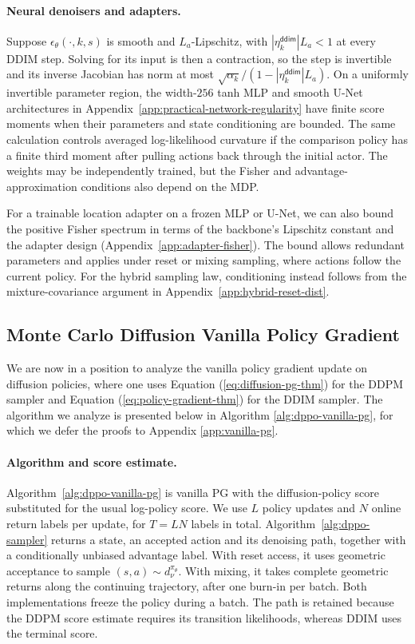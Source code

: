 \paragraph{Neural denoisers and adapters.}
Suppose $\epsilon_\theta(\cdot,k,s)$ is smooth and $L_a$-Lipschitz, with $|\eta_k^{\mathsf{ddim}}|L_a<1$ at every DDIM step. Solving for its input is then a contraction, so the step is invertible and its inverse Jacobian has norm at most $\sqrt{\alpha_k}/(1-|\eta_k^{\mathsf{ddim}}|L_a)$. On a uniformly invertible parameter region, the width-$256$ tanh MLP and smooth U-Net architectures in Appendix~\ref{app:practical-network-regularity} have finite score moments when their parameters and state conditioning are bounded. The same calculation controls averaged log-likelihood curvature if the comparison policy has a finite third moment after pulling actions back through the initial actor. The weights may be independently trained, but the Fisher and advantage-approximation conditions also depend on the MDP.

For a trainable location adapter on a frozen MLP or U-Net, we can also bound the positive Fisher spectrum in terms of the backbone's Lipschitz constant and the adapter design (Appendix~\ref{app:adapter-fisher}). The bound allows redundant parameters and applies under reset or mixing sampling, where actions follow the current policy. For the hybrid sampling law, conditioning instead follows from the mixture-covariance argument in Appendix~\ref{app:hybrid-reset-dist}.



\subsection{Monte Carlo Diffusion Vanilla Policy Gradient}
We are now in a position to analyze the vanilla policy gradient update on diffusion policies, where one uses Equation (\ref{eq:diffusion-pg-thm}) for the DDPM sampler and Equation (\ref{eq:policy-gradient-thm}) for the DDIM sampler. The algorithm we analyze is presented below in Algorithm \ref{alg:dppo-vanilla-pg}, for which we defer the proofs to Appendix \ref{app:vanilla-pg}.


\paragraph{Algorithm and score estimate.}
Algorithm~\ref{alg:dppo-vanilla-pg} is vanilla PG with the diffusion-policy score substituted for the usual log-policy score. We use $L$ policy updates and $N$ online return labels per update, for $T=LN$ labels in total. Algorithm~\ref{alg:dppo-sampler} returns a state, an accepted action and its denoising path, together with a conditionally unbiased advantage label. With reset access, it uses geometric acceptance to sample $(s,a)\sim d_\nu^{\pi_\theta}$. With mixing, it takes complete geometric returns along the continuing trajectory, after one burn-in per batch. Both implementations freeze the policy during a batch. The path is retained because the DDPM score estimate requires its transition likelihoods, whereas DDIM uses the terminal score.

